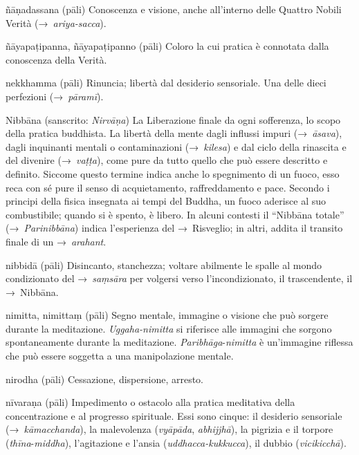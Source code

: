 \begin{glossarydescription}
\item[ñāṇadassana] (pāli) Conoscenza e visione, anche all'interno delle Quattro
  Nobili Verità (→~\emph{ariya-sacca}).

\item[ñāyapaṭipanna, ñāyapaṭipanno] (pāli) Coloro la cui pratica è connotata
  dalla conoscenza della Verità.

\item[nekkhamma] (pāli) Rinuncia; libertà dal desiderio sensoriale. Una delle
  dieci perfezioni (→~\emph{pāramī}).

\item[Nibbāna] (sanscrito: \emph{Nirvāṇa}) La Liberazione finale da ogni
  sofferenza, lo scopo della pratica buddhista. La libertà della mente dagli
  influssi impuri (→~\emph{āsava}), dagli inquinanti mentali o contaminazioni
  (→~\emph{kilesa}) e dal ciclo della rinascita e del divenire (→~\emph{vaṭṭa}),
  come pure da tutto quello che può essere descritto e definito. Siccome questo
  termine indica anche lo spegnimento di un fuoco, esso reca con sé pure il
  senso di acquietamento, raffreddamento e pace. Secondo i principi della fisica
  insegnata ai tempi del Buddha, un fuoco aderisce al suo combustibile; quando
  si è spento, è libero. In alcuni contesti il ``Nibbāna totale''
  (→~\emph{Parinibbāna}) indica l'esperienza del →~Risveglio; in altri, addita
  il transito finale di un →~\emph{arahant}.

\item[nibbidā] (pāli) Disincanto, stanchezza; voltare abilmente le spalle al
  mondo condizionato del →~\emph{saṃsāra} per volgersi verso l'incondizionato,
  il trascendente, il →~Nibbāna.

\item[nimitta, nimittaṃ] (pāli) Segno mentale, immagine o visione che può
  sorgere durante la meditazione. \emph{Uggaha-nimitta} si riferisce alle
  immagini che sorgono spontaneamente durante la meditazione.
  \emph{Paribhāga}-\emph{nimitta} è un'immagine riflessa che può essere soggetta
  a una manipolazione mentale.

\item[nirodha] (pāli) Cessazione, dispersione, arresto.

\item[nīvaraṇa] (pāli) Impedimento o ostacolo alla pratica meditativa della
  concentrazione e al progresso spirituale. Essi sono cinque: il desiderio
  sensoriale (→~\emph{kāmacchanda}), la malevolenza (\emph{vyāpāda},
  \emph{abhijjhā}), la pigrizia e il torpore (\emph{thīna}-\emph{middha}),
  l'agitazione e l'ansia (\emph{uddhacca-kukkucca}), il dubbio
  (\emph{vicikicchā}).


\end{glossarydescription}
